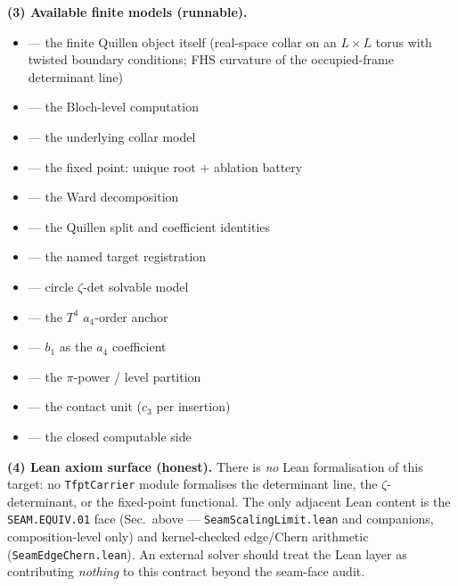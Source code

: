 \documentclass[11pt,a4paper]{article}
\newcommand{\cthree}{c_3}
\begin{document}
\par\smallskip\noindent\textbf{(3) Available finite models (runnable).}
\begin{itemize}
\item {} --- the finite Quillen object itself (real-space
  collar on an $L\times L$ torus with twisted boundary conditions; FHS curvature of the
  occupied-frame determinant line)
\item {} --- the Bloch-level computation
\item {} --- the underlying collar model
\item {} --- the fixed point: unique root $+$ ablation battery
\item {} --- the Ward decomposition
\item {} --- the Quillen split and coefficient identities
\item {} --- the named target registration
\item {} --- circle $\zeta$-det solvable model
\item {} --- the $T^4$ $a_4$-order anchor
\item {} --- $b_1$ as the $a_4$ coefficient
\item {} --- the $\pi$-power / level partition
\item {} --- the contact unit ($\cthree$ per insertion)
\item {} --- the closed computable side
\end{itemize}

\par\smallskip\noindent\textbf{(4) Lean axiom surface (honest).} There is \emph{no} Lean
formalisation of this target: no \texttt{TfptCarrier} module formalises the determinant line,
the $\zeta$-determinant, or the fixed-point functional. The only adjacent Lean content is the
\texttt{SEAM.EQUIV.01} face (Sec.\ above --- \texttt{SeamScalingLimit.lean} and companions,
composition-level only) and kernel-checked edge/Chern arithmetic
(\texttt{SeamEdgeChern.lean}). An external solver should treat the Lean layer as contributing
\emph{nothing} to this contract beyond the seam-face audit.
\end{document}
